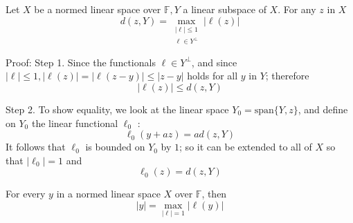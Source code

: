 \documentclass[12pt, oneside]{book}
\begin{document}
\begin{theorem}
    Let $X$ be a normed linear space over $\mathbb{F}, Y$ a linear subspace of $X$. For any $z$ in $X$
    \begin{equation*}
        d(z,Y)
        =
        \max_{ \substack{ \left|\ell\right|\leq 1\\ \ell \in  Y^\bot} }|\ell(z)|
    \end{equation*}

    Proof:
    Step 1.
    Since the functionals $\ell \in Y^\bot$, and since $|\ell| \leq 1,|\ell(z)|=|\ell(z-y)| \leq|z-y|$ holds for all $y$ in $Y$; therefore
    \begin{equation*}
        |\ell(z)| \leq d(z,Y)
    \end{equation*}

    Step 2.
    To show equality, we look at the linear space $Y_0 = \mathrm{span}\{Y,z\}$, and define on $Y_0$ the linear functional $\ell_0$ :
    \begin{equation*}
        \ell_0(y+a z)=a d(z,Y)
    \end{equation*}
    It follows that $\ell_0$ is bounded on $Y_0$ by $1$; so it can be extended to all of $X$ so that $\left|\ell_0\right|=1$ and
    \begin{equation*}
        \ell_0(z)=d(z,Y)
    \end{equation*}
\end{theorem}
\begin{corollary}
    For every $y$ in a normed linear space $X$ over $\mathbb{F}$, then
    \begin{equation*}
        |y|=\max _{|\ell|=1}|\ell(y)|
    \end{equation*}
\end{corollary}

\section{}
\end{document}
